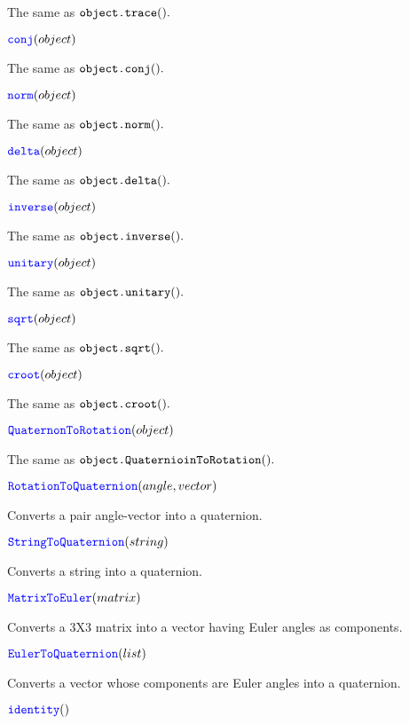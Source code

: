 \documentclass[11pt]{paper}
\begin{document}
The same as $\texttt{\mbox{object.trace}}().$

\medskip
\noindent $\textcolor{blue}{\texttt{\mbox{conj}}}(object)$ 

The same as $\texttt{\mbox{object.conj}}().$

\medskip
\noindent $\textcolor{blue}{\texttt{\mbox{norm}}}(object)$ 

The same as $\texttt{\mbox{object.norm}}().$

\medskip
\noindent $\textcolor{blue}{\texttt{\mbox{delta}}}(object)$ 

The same as $\texttt{\mbox{object.delta}}().$

\medskip
\noindent $\textcolor{blue}{\texttt{\mbox{inverse}}}(object)$ 

The same as $\texttt{\mbox{object.inverse}}().$

\medskip
\noindent $\textcolor{blue}{\texttt{\mbox{unitary}}}(object)$ 

The same as $\texttt{\mbox{object.unitary}}().$

\medskip
\noindent $\textcolor{blue}{\texttt{\mbox{sqrt}}}(object)$ 

The same as $\texttt{\mbox{object.sqrt}}().$

\medskip
\noindent $\textcolor{blue}{\texttt{\mbox{croot}}}(object)$ 

The same as $\texttt{\mbox{object.croot}}().$

\medskip
\noindent $\textcolor{blue}{\texttt{\mbox{QuaternonToRotation}}}(object)$ 

The same as $\texttt{\mbox{object.QuaternioinToRotation}}().$

\medskip
\noindent $\textcolor{blue}{\texttt{\mbox{RotationToQuaternion}}}(angle,vector)$ 

Converts a pair angle-vector into a quaternion.


\medskip
\noindent $\textcolor{blue}{\texttt{\mbox{StringToQuaternion}}}(string)$ 

Converts a string into a quaternion.

\medskip
\noindent $\textcolor{blue}{\texttt{\mbox{MatrixToEuler}}}(matrix)$ 

Converts a 3X3 matrix into a vector having Euler angles as components.

\medskip
\noindent $\textcolor{blue}{\texttt{\mbox{EulerToQuaternion}}}(list)$ 

Converts a vector whose components are Euler angles into a quaternion.
    

\medskip
\noindent $\textcolor{blue}{\texttt{\mbox{identity}}}()$ 
\end{document}
